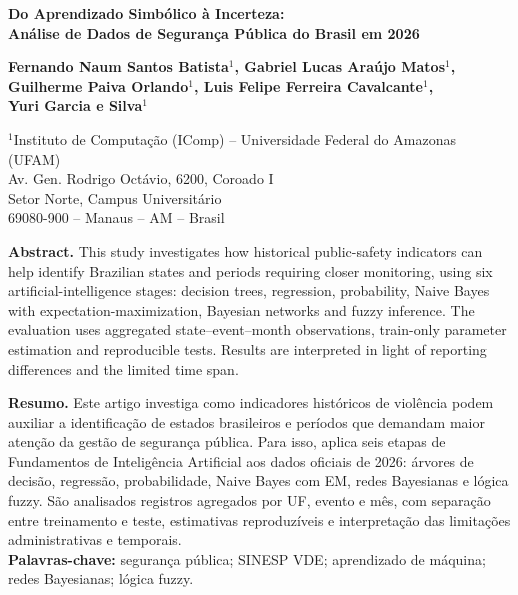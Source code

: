 \documentclass[12pt,a4paper]{article}
\begin{document}
\begin{center}
{\fontsize{16}{19}\selectfont\bfseries Do Aprendizado Simbólico à Incerteza:\\ Análise de Dados de Segurança Pública do Brasil em 2026\par}
\vspace{12pt}
{\fontsize{12}{15}\selectfont\bfseries Fernando Naum Santos Batista$^{1}$, Gabriel Lucas Araújo Matos$^{1}$,\\
Guilherme Paiva Orlando$^{1}$, Luis Felipe Ferreira Cavalcante$^{1}$,\\
Yuri Garcia e Silva$^{1}$\par}
\vspace{12pt}
{\fontsize{12}{15}\selectfont
$^{1}$Instituto de Computação (IComp) -- Universidade Federal do Amazonas (UFAM)\\
Av. Gen. Rodrigo Octávio, 6200, Coroado I\\
Setor Norte, Campus Universitário\\
69080-900 -- Manaus -- AM -- Brasil\par}
\end{center}
\vspace{10pt}
\begin{list}{}{\setlength{\leftmargin}{.8cm}\setlength{\rightmargin}{.8cm}\setlength{\topsep}{0pt}\setlength{\itemsep}{0pt}}
\item[] \textbf{Abstract.} This study investigates how historical public-safety indicators can help identify Brazilian states and periods requiring closer monitoring, using six artificial-intelligence stages: decision trees, regression, probability, Naive Bayes with expectation-maximization, Bayesian networks and fuzzy inference. The evaluation uses aggregated state--event--month observations, train-only parameter estimation and reproducible tests. Results are interpreted in light of reporting differences and the limited time span.
\end{list}
\vspace{-3pt}
\begin{list}{}{\setlength{\leftmargin}{.8cm}\setlength{\rightmargin}{.8cm}\setlength{\topsep}{0pt}\setlength{\itemsep}{0pt}}
\item[] \textbf{Resumo.} Este artigo investiga como indicadores históricos de violência podem auxiliar a identificação de estados brasileiros e períodos que demandam maior atenção da gestão de segurança pública. Para isso, aplica seis etapas de Fundamentos de Inteligência Artificial aos dados oficiais de 2026: árvores de decisão, regressão, probabilidade, Naive Bayes com EM, redes Bayesianas e lógica fuzzy. São analisados registros agregados por UF, evento e mês, com separação entre treinamento e teste, estimativas reproduzíveis e interpretação das limitações administrativas e temporais. \\ \textbf{Palavras-chave:} segurança pública; SINESP VDE; aprendizado de máquina; redes Bayesianas; lógica fuzzy.
\end{list}
\vspace{2pt}
\end{document}
